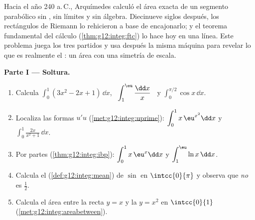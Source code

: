 \begin{problem}
\label{pb:g12:integ:1}
Hacia el año 240 a.\,C., Arquímedes calculó el área exacta de un segmento
parabólico sin , sin límites y sin álgebra. Diecinueve siglos
después, los rectángulos de Riemann lo rehicieron a base de encajonarlo; y
el teorema fundamental del cálculo (\cref{thm:g12:integ:ftc}) lo hace hoy
en una línea. Este problema juega los tres partidos y usa después la misma
máquina para revelar lo que es realmente el : un área con una
simetría de escala.

\medskip
\noindent\textbf{Parte I --- Soltura.}
\begin{enumerate}
  \item Calcula $\displaystyle\int_0^1 (3x^2 - 2x + 1)\,\dd x$, \
        $\displaystyle\int_1^{\eu} \frac{\dd x}{x}$ \ y
        $\displaystyle\int_0^{\pi/2} \cos x\,\dd x$.
  \item Localiza las formas $u'u$ (\cref{met:g12:integ:uprime}):
        $\displaystyle\int_0^1 x\,\eu^{x^2}\dd x$ y
        $\displaystyle\int_0^1 \frac{2x}{x^2 + 1}\,\dd x$.
  \item Por partes (\cref{thm:g12:integ:ibp}):
        $\displaystyle\int_0^1 x\,\eu^x \dd x$ y
        $\displaystyle\int_1^{\eu} \ln x\,\dd x$.
  \item Calcula el  (\cref{def:g12:integ:mean}) de $\sin$ en
        $\intcc{0}{\pi}$ y observa que \emph{no} es $\frac12$.
  \item Calcula el área entre la recta $y = x$ y la  $y = x^2$ en
        $\intcc{0}{1}$ (\cref{met:g12:integ:areabetween}).
\end{enumerate}


\end{problem}
